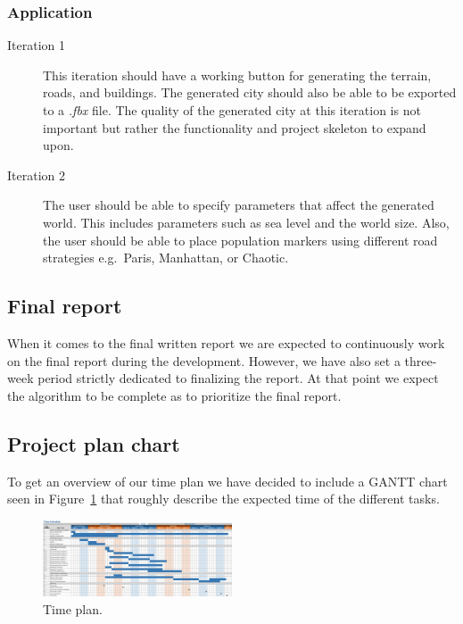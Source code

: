 \subsubsection{Application}
\begin{description}
  \item[Iteration 1]
    This iteration should have a working button for generating the terrain, roads, and buildings.
    The generated city should also be able to be exported to a \textit{.fbx} file.
    The quality of the generated city at this iteration is not important but rather the functionality and project skeleton to expand upon.
  \item[Iteration 2]
    The user should be able to specify parameters that affect the generated world.
    This includes parameters such as sea level and the world size.
    Also, the user should be able to place population markers using different road strategies e.g.\ Paris, Manhattan, or Chaotic.
\end{description}

\subsection{Final report}
When it comes to the final written report we are expected to continuously work on the final report during the development.
However, we have also set a three-week period strictly dedicated to finalizing the report.
At that point we expect the algorithm to be complete as to prioritize the final report.

\subsection{Project plan chart}
To get an overview of our time plan we have decided to include a GANTT chart seen in Figure~\ref{fig:time-plan} that roughly describe the expected time of the different tasks.

\newpage
\begin{figure}[H]
  \centering
  \vspace*{-1.0cm}
  \includegraphics[angle=90, width=0.5\textwidth]{figure/time-plan.png}
  \caption{Time plan.}
  \label{fig:time-plan}
\end{figure}

